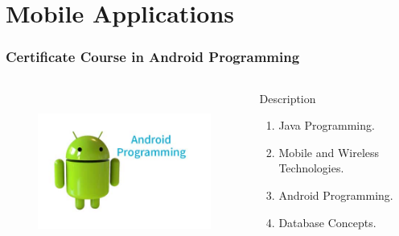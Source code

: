 \section{Mobile Applications}
\begin{frame}
	\frametitle{Certificate Course in Android Programming}
		\begin{columns}
		
		
		\begin{figure}
			\includegraphics[width=200pt,height=150pt]{figures/course_ap.jpg}
		\end{figure}
		
		
		\begin{block}{Description}
			
			\begin{enumerate}
				\item Java Programming. 
				\item Mobile and Wireless Technologies.
				\item Android Programming.
				\item Database Concepts.
			\end{enumerate}
			
		\end{block}
		
	\end{columns}
\end{frame}